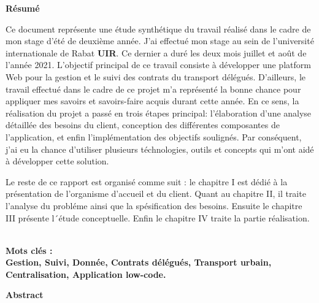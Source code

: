 \documentclass[a4paper]{report}
\begin{document}
\clearpage
{}
\begin{doublespace}
    \begin{center}
        \vspace*{1cm}

        \textbf{\huge{Résumé}}

    \end{center}
\end{doublespace}
\begin{doublespace}
    Ce document représente une étude synthétique du travail réalisé dans le cadre de mon stage d'été de deuxième année. J'ai effectué mon stage au sein de l'université internationale de Rabat \textbf{UIR}. Ce dernier a duré les deux mois juillet et août de l'année 2021. L’objectif principal de ce travail consiste à développer une platform Web pour la gestion et le suivi des contrats du transport délégués. D'ailleurs, le travail effectué dans le cadre de ce projet m'a représenté la bonne chance pour appliquer mes savoirs et savoirs-faire acquis durant cette année. En ce sens, la réalisation du projet a passé en trois étapes principal: l'élaboration d'une analyse détaillée des besoins du client, conception des différentes composantes de l'application, et enfin l'implémentation des objectifs soulignés. Par conséquent, j'ai eu la chance d'utiliser plusieurs téchnologies, outils et concepts qui m'ont aidé à développer cette solution.
\end{doublespace}
\begin{doublespace}

    Le reste de ce rapport est organisé comme suit : le chapitre I est dédié à la présentation de
    l’organisme d’accueil et du client. Quant au chapitre II, il traite l’analyse du probléme ainsi que
    la spésification des besoins. Ensuite le chapitre III présente l´étude conceptuelle. Enfin le chapitre
    IV traite la partie réalisation.

    \textbf	{\\Mots clés :\\ Gestion, Suivi, Donnée, Contrats délégués, Transport urbain, Centralisation, Application low-code.}

\end{doublespace}
\clearpage
{}
\begin{doublespace}
    \begin{center}
        \vspace*{1cm}
        \textbf{\huge{Abstract}}
    \end{center}
\end{doublespace}
\end{document}
